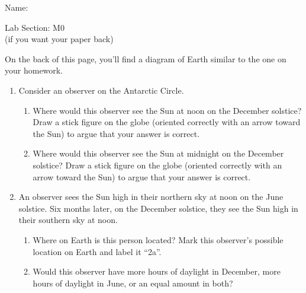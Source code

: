 \documentclass[12pt]{article}
\begin{document}
	\Large
\centerline{}

\begin{minipage}{0.6\textwidth}
	\Large
	Name: \underline{\hspace{3in}}
\end{minipage}
\begin{minipage}{0.4\textwidth}
	\Large
	Lab Section: M0\underline{\hspace{1in}}\\
	\small (if you want your paper back)
\end{minipage}

\normalsize

	On the back of this page, you'll find a diagram of Earth similar to the one on your homework.  


\begin{enumerate}	
	\item Consider an observer on the Antarctic Circle.
	
	\begin{enumerate}
		\item Where would this observer see the Sun at noon on the December solstice? Draw a stick figure on the globe (oriented correctly with an arrow toward the Sun) to argue that your answer is correct.
		
		\vspace{1in}
		
		\item Where would this observer see the Sun at midnight on the December solstice? Draw a stick figure on the globe (oriented correctly with an arrow toward the Sun) to argue that your answer is correct.
		
		\vspace{1.5in}
		
	\end{enumerate} 
	
	\item An observer sees the Sun high in their northern sky at noon on the June solstice. Six months later, on the December solstice, they see the Sun high in their southern sky at noon.
	
	\vspace{1.5in}
	
	
	\begin{enumerate}
		\item Where on Earth is this person located? Mark this observer's possible location on Earth and label it ``2a''.
		
		\item Would this observer have more hours of daylight in December, more hours of daylight in June, or an equal amount in both? 
		
		\vspace{1.5in}
		
	\end{enumerate}
	
	
	
\end{enumerate}
\end{document}
